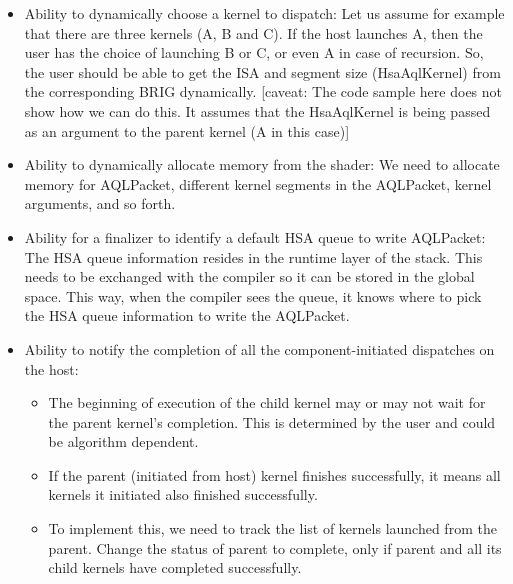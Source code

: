 \begin{itemize}

\item Ability to dynamically choose a kernel to dispatch\-: Let us
assume for example that there are three kernels (A, B and C). If the
host launches A, then the user has the choice of launching B or C,
or even A in case of recursion. So, the user should be able to get
the I\-S\-A and segment size (Hsa\-Aql\-Kernel) from the
corresponding B\-R\-I\-G dynamically. \mbox{[}caveat\-: The code
sample here does not show how we can do this. It assumes that the
Hsa\-Aql\-Kernel is being passed as an argument to the parent kernel
(A in this case)\mbox{]}

\item Ability to dynamically allocate memory from the shader\-: We
need to allocate memory for A\-Q\-L\-Packet, different kernel
segments in the A\-Q\-L\-Packet, kernel arguments, and so forth.

\item Ability for a finalizer to identify a default H\-S\-A queue to
write A\-Q\-L\-Packet\-: The H\-S\-A queue information resides in
the runtime layer of the stack. This needs to be exchanged with the
compiler so it can be stored in the global space. This way, when the
compiler sees the queue, it knows where to pick the H\-S\-A queue
information to write the A\-Q\-L\-Packet.

\item Ability to notify the completion of all the
component-\/initiated dispatches on the host\-:

\begin{itemize}
\item The beginning of execution of the child kernel may or may not
wait for the parent kernel's completion. This is determined by the
user and could be algorithm dependent.
\item If the parent (initiated from host) kernel finishes
successfully, it means all kernels it initiated also finished
successfully.
\item To implement this, we need to track the list of kernels
launched from the parent. Change the status of parent to complete,
only if parent and all its child kernels have completed
successfully.
\end{itemize}
\end{itemize}


